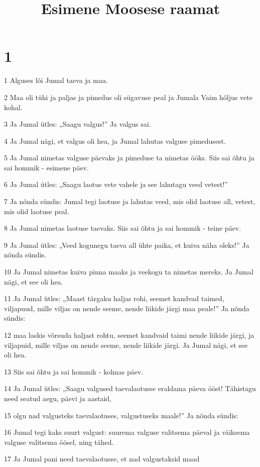 

\title{Esimene Moosese raamat}


\chapter{1}

\par 1 Alguses lõi Jumal taeva ja maa.
\par 2 Maa oli tühi ja paljas ja pimedus oli sügavuse peal ja Jumala Vaim hõljus vete kohal.
\par 3 Ja Jumal ütles: „Saagu valgus!” Ja valgus sai.
\par 4 Ja Jumal nägi, et valgus oli hea, ja Jumal lahutas valguse pimedusest.
\par 5 Ja Jumal nimetas valguse päevaks ja pimeduse ta nimetas ööks. Siis sai õhtu ja sai hommik - esimene päev.
\par 6 Ja Jumal ütles: „Saagu laotus vete vahele ja see lahutagu veed vetest!”
\par 7 Ja nõnda sündis: Jumal tegi laotuse ja lahutas veed, mis olid laotuse all, vetest, mis olid laotuse peal.
\par 8 Ja Jumal nimetas laotuse taevaks. Siis sai õhtu ja sai hommik - teine päev.
\par 9 Ja Jumal ütles: „Veed kogunegu taeva all ühte paika, et kuiva näha oleks!” Ja nõnda sündis.
\par 10 Ja Jumal nimetas kuiva pinna maaks ja veekogu ta nimetas mereks. Ja Jumal nägi, et see oli hea.
\par 11 Ja Jumal ütles: „Maast tärgaku haljas rohi, seemet kandvad taimed, viljapuud, mille viljas on nende seeme, nende liikide järgi maa peale!” Ja nõnda sündis:
\par 12 maa laskis võrsuda haljast rohtu, seemet kandvaid taimi nende liikide järgi, ja viljapuid, mille viljas on nende seeme, nende liikide järgi. Ja Jumal nägi, et see oli hea.
\par 13 Siis sai õhtu ja sai hommik - kolmas päev.
\par 14 Ja Jumal ütles: „Saagu valgused taevalaotusse eraldama päeva ööst! Tähistagu need seatud aegu, päevi ja aastaid,
\par 15 olgu nad valgusteks taevalaotuses, valgustuseks maale!” Ja nõnda sündis:
\par 16 Jumal tegi kaks suurt valgust: suurema valguse valitsema päeval ja väiksema valguse valitsema öösel, ning tähed.
\par 17 Ja Jumal pani need taevalaotusse, et nad valgustaksid maad
